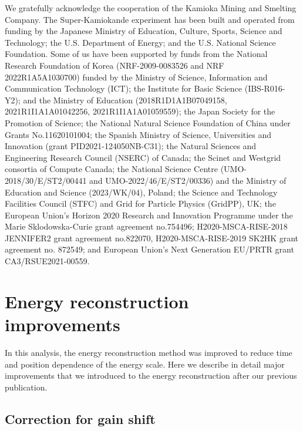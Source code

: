 \documentclass[aps,prd,reprint,superscriptaddress,floatfix,altaffilletter,nofootinbib]{revtex4-2}
\begin{document}
We gratefully acknowledge the cooperation of the Kamioka Mining and Smelting Company.
The Super-Kamiokande experiment has been built and operated from funding by the
Japanese Ministry of Education, Culture, Sports, Science and Technology; the U.S.
Department of Energy; and the U.S. National Science Foundation. Some of us have been
supported by funds from the National Research Foundation of Korea (NRF-2009-0083526
and NRF 2022R1A5A1030700) funded by the Ministry of Science,
Information and Communication Technology (ICT); the Institute for
Basic Science (IBS-R016-Y2); and the Ministry of Education (2018R1D1A1B07049158,
2021R1I1A1A01042256, 2021R1I1A1A01059559); the Japan Society for the Promotion of Science; the National
Natural Science Foundation of China under Grants No.11620101004; the Spanish Ministry of Science,
Universities and Innovation (grant PID2021-124050NB-C31); the Natural Sciences and
Engineering Research Council (NSERC) of Canada; the Scinet and Westgrid consortia of
Compute Canada; the National Science Centre (UMO-2018/30/E/ST2/00441 and
UMO-2022/46/E/ST2/00336) and the Ministry of Education and Science (2023/WK/04),
Poland; the Science and Technology Facilities Council (STFC) and
Grid for Particle Physics (GridPP), UK; the European Union's
Horizon 2020 Research and Innovation Programme under the Marie Sklodowska-Curie grant
agreement no.754496; H2020-MSCA-RISE-2018 JENNIFER2 grant agreement no.822070,
H2020-MSCA-RISE-2019 SK2HK grant agreement no. 872549; and
European Union's Next Generation EU/PRTR grant CA3/RSUE2021-00559.


\appendix


\section{Energy reconstruction improvements} \label{sec:app_erec}

In this analysis, the energy reconstruction method was improved to reduce
time and position dependence of the energy scale. Here we describe
in detail
major improvements that we introduced to the energy reconstruction after our
previous publication.

\subsection{Correction for gain shift}
\end{document}
